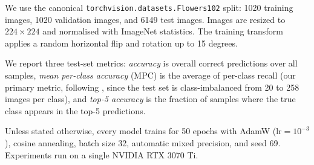 We use the canonical \texttt{torchvision.datasets.Flowers102} split: 1020 training images, 1020 validation images, and 6149 test images. Images are resized to $224 \times 224$ and normalised with ImageNet statistics. The training transform applies a random horizontal flip and rotation up to 15 degrees.

We report three test-set metrics: \emph{accuracy} is overall correct predictions over all samples, \emph{mean per-class accuracy} (MPC) is the average of per-class recall (our primary metric, following \citet{nilsback2008}, since the test set is class-imbalanced from 20 to 258 images per class), and \emph{top-5 accuracy} is the fraction of samples where the true class appears in the top-5 predictions.

Unless stated otherwise, every model trains for 50 epochs with AdamW ($\text{lr} = 10^{-3}$), cosine annealing, batch size 32, automatic mixed precision, and seed 69. Experiments run on a single NVIDIA RTX 3070 Ti.
